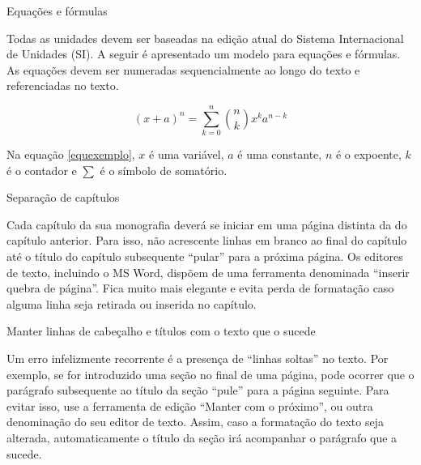 \begin{enumerate}[label=\alph*)]
{\bfseries \item  Equações e fórmulas}

Todas as unidades devem ser baseadas na edição atual do Sistema Internacional de Unidades (SI). A seguir é apresentado um modelo para equações e fórmulas. As equações devem ser numeradas sequencialmente ao longo do texto e referenciadas no texto.

\begin{equation}
(x+a)^{n}= \sum_{k=0}^{n}\binom{n}{k}x^{k}a^{n-k}
\label{equexemplo}
\end{equation}




Na equação \ref{equexemplo}, \begin{math}x\end{math} é uma variável, \begin{math}a\end{math} é uma constante, \begin{math}n\end{math} é o expoente, \begin{math}k\end{math} é o contador e \begin{math}\sum\end{math} é o símbolo de somatório.

{\bfseries \item  Separação de capítulos}

Cada capítulo da sua monografia deverá se iniciar em uma página distinta da do capítulo anterior. Para isso, não acrescente linhas em branco ao final do capítulo até o título do capítulo subsequente “pular” para a próxima página. Os editores de texto, incluindo o MS Word, dispõem de uma ferramenta denominada “inserir quebra de página”. Fica muito mais elegante e evita perda de formatação caso alguma linha seja retirada ou inserida no capítulo.

{\bfseries \item  Manter linhas de cabeçalho e títulos com o texto que o sucede}

Um erro infelizmente recorrente é a presença de “linhas soltas” no texto. Por exemplo, se for introduzido uma seção no final de uma página, pode ocorrer que o parágrafo subsequente ao título da seção “pule” para a página seguinte. Para evitar isso, use a ferramenta de edição “Manter com o próximo”, ou outra denominação do seu editor de texto. Assim, caso a formatação do texto seja alterada, automaticamente o título da seção irá acompanhar o parágrafo que a sucede.


\end{enumerate}
